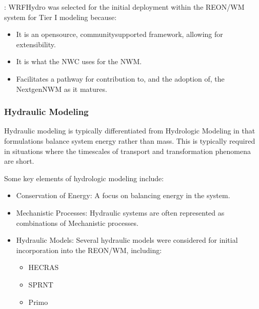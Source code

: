 \documentclass[letterpaper,10pt,english]{sphinxmanual}
\begin{document}
\sphinxAtStartPar
{}: WRF\sphinxhyphen{}Hydro was selected for the initial deployment within the REON/WM system for Tier I modeling because:
\begin{itemize}
\item {} 
\sphinxAtStartPar
It is an open\sphinxhyphen{}source, community\sphinxhyphen{}supported framework, allowing for extensibility.

\item {} 
\sphinxAtStartPar
It is what the NWC uses for the NWM.

\item {} 
\sphinxAtStartPar
Facilitates a pathway for contribution to, and the adoption of, the Nextgen\sphinxhyphen{}NWM as it matures.

\end{itemize}

\subsubsection{Hydraulic Modeling}
\label{\detokenize{requirements/knowledge/hydraulic:hydraulic-modeling}}\label{\detokenize{requirements/knowledge/hydraulic::doc}}
\sphinxAtStartPar
Hydraulic modeling is typically differentiated from Hydrologic Modeling in that formulations balance system energy rather than mass. This is typically required in situations where the timescales of transport and transformation phenomena are short.

\sphinxAtStartPar
Some key elements of hydrologic modeling include:
\begin{itemize}
\item {} 
\sphinxAtStartPar
Conservation of Energy: A focus on balancing energy in the system.

\item {} 
\sphinxAtStartPar
Mechanistic Processes: Hydraulic systems are often represented as combinations of Mechanistic processes.

\item {} 
\sphinxAtStartPar
Hydraulic Models: Several hydraulic models were considered for initial incorporation into the REON/WM, including:
\begin{itemize}
\item {} 
\sphinxAtStartPar
HEC\sphinxhyphen{}RAS

\item {} 
\sphinxAtStartPar
SPRNT

\item {} 
\sphinxAtStartPar
Primo

\end{itemize}

\end{itemize}
\end{document}
